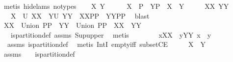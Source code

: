 \begin{isabellebody}
\ {\isacharparenleft}metis\ {\isacharparenleft}hide{\isacharunderscore}lams{\isacharcomma}\ no{\isacharunderscore}types{\isacharparenright}{\isacharparenright}\isanewline
\isacommand{{\isacharbraceleft}}\isamarkupfalse%
\isanewline
\ \ \isamarkupfalse%
\ X\ Y\ \isamarkupfalse%
\ \isanewline
\ \ {}{\isacharcolon}\ {\isachardoublequoteopen}X\ {\isasymin}\ {\isacharquery}P{}\ {\isacharampersand}\ Y{\isasymin}{\isacharquery}P{}\ {\isacharampersand}\ X\ {\isasymnoteq}\ Y{\isachardoublequoteclose}\isanewline
\ \ \isamarkupfalse%
\ \isamarkupfalse%
\ XX\ YY\ \ \isanewline
\ \ {}{\isacharcolon}\ {\isachardoublequoteopen}X\ {\isacharequal}\ {\isacharquery}U\ XX\ {\isacharampersand}\ Y{\isacharequal}{\isacharquery}U\ YY\ {\isacharampersand}\ XX{\isasymin}PP\ {\isacharampersand}\ YY{\isasymin}PP{\isachardoublequoteclose}\ \isamarkupfalse%
\ blast\isanewline
\ \ \isamarkupfalse%
\ \isamarkupfalse%
\ {\isachardoublequoteopen}XX\ {\isasymsubseteq}\ Union\ PP\ {\isacharampersand}\ YY\ {\isasymsubseteq}\ Union\ PP\ {\isacharampersand}\ XX\ {\isasyminter}\ YY\ {\isacharequal}\ {\isacharbraceleft}{\isacharbraceright}{\isachardoublequoteclose}\ \isanewline
\ \ \isamarkupfalse%
\ {}\ {}\ is{\isacharunderscore}partition{\isacharunderscore}def\ assms{\isacharparenleft}{}{\isacharparenright}\ Sup{\isacharunderscore}upper\ \isamarkupfalse%
\ metis\isanewline
\ \ \isamarkupfalse%
\ \isamarkupfalse%
\ \isamarkupfalse%
\ {\isachardoublequoteopen}{\isasymforall}\ x{\isasymin}XX{\isachardot}\ {\isasymforall}\ y{\isasymin}YY{\isachardot}\ x\ {\isasyminter}\ y\ {\isacharequal}\ {\isacharbraceleft}{\isacharbraceright}{\isachardoublequoteclose}\ \isamarkupfalse%
\ {}\ assms{\isacharparenleft}{}{\isacharparenright}\ is{\isacharunderscore}partition{\isacharunderscore}def\ \isanewline
{}\isamarkupfalse%
\ {\isacharparenleft}metis\ IntI\ empty{\isacharunderscore}iff\ subsetCE{\isacharparenright}\isanewline
\ \ \isamarkupfalse%
\ \isamarkupfalse%
\ {\isachardoublequoteopen}X\ {\isasyminter}\ Y{\isacharequal}{\isacharbraceleft}{\isacharbraceright}{\isachardoublequoteclose}\ \isamarkupfalse%
\ assms\ {}\ {}\ {}\ is{\isacharunderscore}partition{\isacharunderscore}def\ \isamarkupfalse%

\end{isabellebody}

